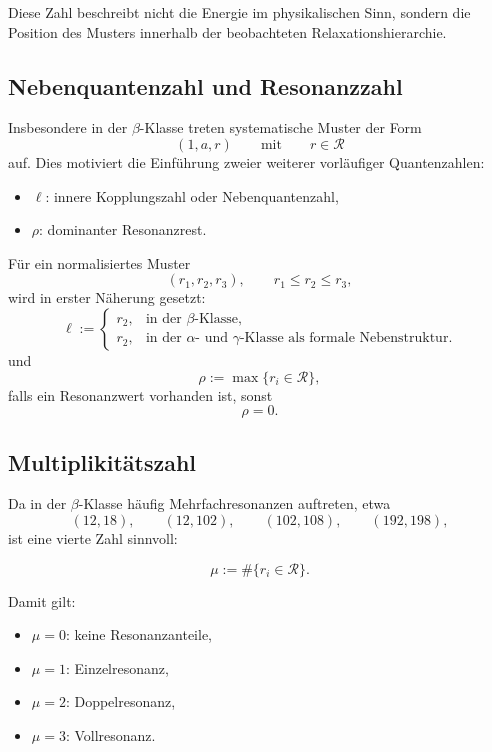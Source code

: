 \documentclass[11pt,a4paper]{article}
\theoremstyle{definition}
\theoremstyle{plain}
\theoremstyle{remark}
\begin{document}
	Diese Zahl beschreibt nicht die Energie im physikalischen Sinn, sondern die Position des Musters innerhalb der beobachteten Relaxationshierarchie.
	
	\subsection{Nebenquantenzahl und Resonanzzahl}
	
	Insbesondere in der \(\beta\)-Klasse treten systematische Muster der Form
	\[
	(1,a,r)
	\qquad\text{mit}\qquad
	r\in\mathcal R
	\]
	auf. 
	Dies motiviert die Einführung zweier weiterer vorläufiger Quantenzahlen:
	
	\begin{itemize}
		\item \(\ell\): innere Kopplungszahl oder Nebenquantenzahl,
		\item \(\rho\): dominanter Resonanzrest.
	\end{itemize}
	
	Für ein normalisiertes Muster
	\[
	(r_1,r_2,r_3),\qquad r_1\le r_2\le r_3,
	\]
	wird in erster Näherung gesetzt:
	\[
	\ell :=
	\begin{cases}
		r_2,& \text{in der } \beta\text{-Klasse},\\
		r_2,& \text{in der } \alpha\text{- und } \gamma\text{-Klasse als formale Nebenstruktur}.
	\end{cases}
	\]
	und
	\[
	\rho :=
	\max\{r_i\in\mathcal R\},
	\]
	falls ein Resonanzwert vorhanden ist, sonst
	\[
	\rho=0.
	\]
	
	\subsection{Multiplikitätszahl}
	
	Da in der \(\beta\)-Klasse häufig Mehrfachresonanzen auftreten, etwa
	\[
	(12,18),\qquad (12,102),\qquad (102,108),\qquad (192,198),
	\]
	ist eine vierte Zahl sinnvoll:
	
	\[
	\mu := \#\{r_i\in\mathcal R\}.
	\]
	
	Damit gilt:
	\begin{itemize}
		\item \(\mu=0\): keine Resonanzanteile,
		\item \(\mu=1\): Einzelresonanz,
		\item \(\mu=2\): Doppelresonanz,
		\item \(\mu=3\): Vollresonanz.
	\end{itemize}
	
\end{document}

